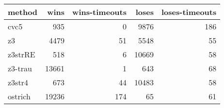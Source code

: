 \begin{tabular}{lrrrr}
\hline
 method   &   wins &   wins-timeouts &   loses &   loses-timeouts \\
\hline
 cvc5     &    935 &               0 &    9876 &              186 \\
 z3       &   4479 &              51 &    5548 &               55 \\
 z3strRE  &    518 &               6 &   10669 &               58 \\
 z3-trau  &  13661 &               1 &     643 &               68 \\
 z3str4   &    673 &              44 &   10483 &               58 \\
 ostrich  &  19236 &             174 &      65 &               61 \\
\hline
\end{tabular}
